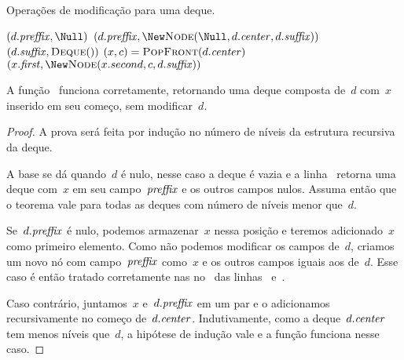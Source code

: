 \documentclass[main.tex]{subfiles}
\begin{document}
\begin{algorithm}
\caption{Operações de modificação para uma deque.} \label{lst:deque_mod}
\begin{algorithmic}[1]

        \State \Return \New {} \label{line:dm:puf1}
     \label{line:dm:puf2}
        \State \Return \New {}\label{line:dm:puf2_1}
    \Else
        \State \Return \New {} \label{line:dm:puf3}
    \EndIf
\EndFunction

     \label{line:dm:pof0}
        \State \Return $(d.\V{preffix}, \Null)$
     \label{line:dm:pof1}
        \State \Return $(d.\V{preffix}, \New \Call{Node}{\Null, d.\V{center}, d.\V{suffix}})$ \label{line:dm:pof1_2}
        \State \Return $(d.\V{suffix}, \Call{Deque}{\null})$ \label{line:dm:pof2}
    \Else
        \State $(x, c) = \Call{PopFront}{d.\V{center}}$
        \State \Return $(x.\V{first}, \New \Call{Node}{x.second, c, d.\V{suffix}})$ \label{line:dm:pof3}
    \EndIf
\EndFunction

\end{algorithmic}
\end{algorithm}

\begin{proposition}
A função~ funciona corretamente, retornando uma deque composta de~$d$ com~$x$ inserido em seu começo, sem modificar~$d$.
\end{proposition}

\begin{proof}
A prova será feita por indução no número de níveis da estrutura recursiva da deque.

A base se dá quando~$d$ é nulo, nesse caso a deque é vazia e a linha~ retorna uma deque com~$x$ em seu campo~$\mathit{preffix}$ e os outros campos nulos. Assuma então que o teorema vale para todas as deques com número de níveis menor que~$d$.

Se~$d.\mathit{preffix}$ é nulo, podemos armazenar~$x$ nessa posição e teremos adicionado~$x$ como primeiro elemento. Como não podemos modificar os campos de~$d$, criamos um novo nó com campo~$\mathit{preffix}$ como~$x$ e os outros campos iguais aos de~$d$. Esse caso é então tratado corretamente nas no~ das linhas~ e~.

Caso contrário, juntamos~$x$ e~$d.\mathit{preffix}$ em um par e o adicionamos recursivamente no começo de~$d.\mathit{center}$. Indutivamente, como a deque~$d.\mathit{center}$ tem menos níveis que~$d$, a hipótese de indução vale e a função funciona nesse caso.
\end{proof}
\end{document}

